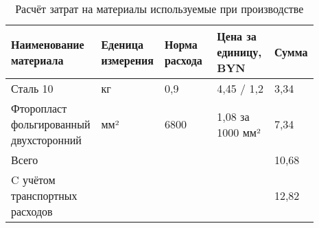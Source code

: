 \begin{table}[H]
  \small
  \caption{Расчёт затрат на материалы используемые при производстве}
  \begin{tabular}{|p{0.2\linewidth} | p{0.2\linewidth}| p{0.2\linewidth} |p{0.2\linewidth}| p{0.09\linewidth} |}
    \hline
Наименование материала & Еденица измерения & Норма расхода & Цена за единицу, BYN & Сумма\\[0pt]
\hline
    Сталь 10 & кг & 0,9 & 4,45 / 1,2 & 3,34\\[0pt]
    \hline
    Фторопласт фольгированный двухсторонний & мм² & 6800 & 1,08 за 1000  мм² & 7,34\\[0pt]
    \hline
    Всего &  &  &  & 10,68 \\[0pt]
    \hline
    C учётом транспортных расходов &  &  &  & 12,82 \\[0pt]
    \hline
\end{tabular}
\end{table}


